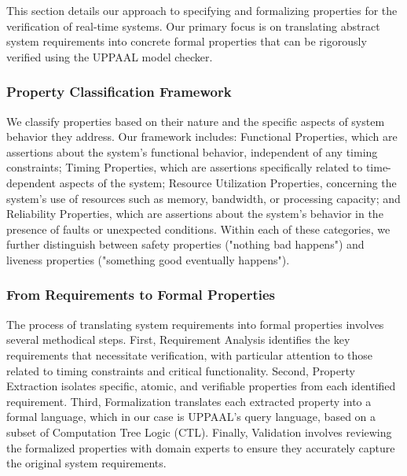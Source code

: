This section details our approach to specifying and formalizing properties for the verification of real-time systems. Our primary focus is on translating abstract system requirements into concrete formal properties that can be rigorously verified using the UPPAAL model checker.

\subsubsection{Property Classification Framework}
We classify properties based on their nature and the specific aspects of system behavior they address. Our framework includes: Functional Properties, which are assertions about the system's functional behavior, independent of any timing constraints; Timing Properties, which are assertions specifically related to time-dependent aspects of the system; Resource Utilization Properties, concerning the system's use of resources such as memory, bandwidth, or processing capacity; and Reliability Properties, which are assertions about the system's behavior in the presence of faults or unexpected conditions. Within each of these categories, we further distinguish between safety properties ("nothing bad happens") and liveness properties ("something good eventually happens").

\subsubsection{From Requirements to Formal Properties}
The process of translating system requirements into formal properties involves several methodical steps. First, Requirement Analysis identifies the key requirements that necessitate verification, with particular attention to those related to timing constraints and critical functionality. Second, Property Extraction isolates specific, atomic, and verifiable properties from each identified requirement. Third, Formalization translates each extracted property into a formal language, which in our case is UPPAAL's query language, based on a subset of Computation Tree Logic (CTL). Finally, Validation involves reviewing the formalized properties with domain experts to ensure they accurately capture the original system requirements.

